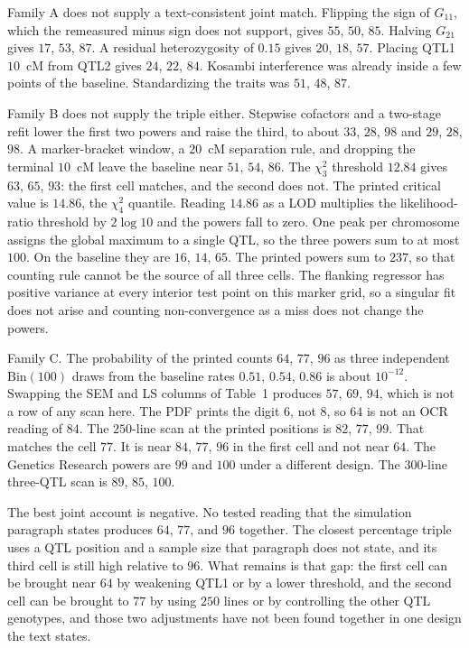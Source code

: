 \documentclass[11pt]{article}
\begin{document}
Family A does not supply a text-consistent joint match. Flipping the sign
of $G_{11}$, which the remeasured minus sign does not support, gives $55$, $50$,
$85$. Halving $G_{21}$ gives $17$, $53$, $87$. A residual heterozygosity of
$0.15$ gives $20$, $18$, $57$. Placing QTL1 $10$~cM from QTL2 gives $24$,
$22$, $84$. Kosambi interference was already inside a few points of the
baseline. Standardizing the traits was $51$, $48$, $87$.

Family B does not supply the triple either. Stepwise cofactors and a
two-stage refit lower the first two powers and raise the third, to about
$33$, $28$, $98$ and $29$, $28$, $98$. A marker-bracket window, a $20$~cM
separation rule, and dropping the terminal $10$~cM leave the baseline near
$51$, $54$, $86$. The $\chi^2_3$ threshold $12.84$ gives $63$, $65$, $93$:
the first cell matches, and the second does not. The printed critical value
is $14.86$, the $\chi^2_4$ quantile. Reading $14.86$ as a LOD multiplies the
likelihood-ratio threshold by $2\log 10$ and the powers fall to zero. One
peak per chromosome assigns the global maximum to a single QTL, so the three
powers sum to at most $100$. On the baseline they are $16$, $14$, $65$.
The printed powers sum to $237$, so that counting rule cannot be the source
of all three cells. The flanking regressor has positive variance at every
interior test point on this marker grid, so a singular fit does not arise
and counting non-convergence as a miss does not change the powers.

Family C. The probability of the printed counts $64$, $77$, $96$ as three
independent $\mathrm{Bin}(100)$ draws from the baseline rates $0.51$,
$0.54$, $0.86$ is about $10^{-12}$. Swapping the SEM and LS columns of
Table~1 produces $57$, $69$, $94$, which is not a row of any scan here.
The PDF prints the digit 6, not 8, so $64$ is not an OCR reading of $84$.
The $250$-line scan at the printed positions is $82$, $77$, $99$. That
matches the cell $77$. It is near $84$, $77$, $96$ in the first cell and
not near $64$. The Genetics Research powers are $99$ and $100$ under a
different design. The $300$-line three-QTL scan is $89$, $85$, $100$.

The best joint account is negative. No tested reading that the simulation
paragraph states produces $64$, $77$, and $96$ together. The closest
percentage triple uses a QTL position and a sample size that paragraph does
not state, and its third cell is still high relative to $96$. What remains
is that gap: the first cell can be brought near $64$ by weakening QTL1 or
by a lower threshold, and the second cell can be brought to $77$ by using
$250$ lines or by controlling the other QTL genotypes, and those two
adjustments have not been found together in one design the text states.
\end{document}
